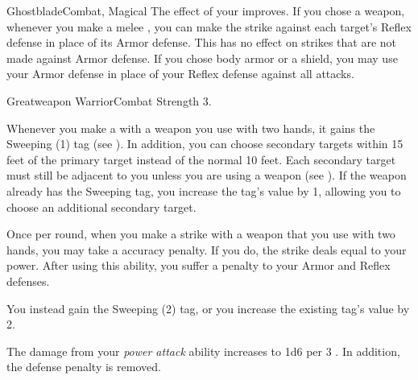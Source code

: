 \begin{magicalfeat}{Ghostblade}{Combat, Magical}
         The effect of your  improves.
        If you chose a weapon, whenever you make a melee , you can make the strike against each target's Reflex defense in place of its Armor defense.
        This has no effect on strikes that are not made against Armor defense.
        If you chose body armor or a shield, you may use your Armor defense in place of your Reflex defense against all attacks.
    \end{magicalfeat}

    \begin{feat}{Greatweapon Warrior}{Combat}
        \featpre Strength 3.

         Whenever you make a   with a weapon you use with two hands, it gains the Sweeping (1) tag (see ).
        In addition, you can choose secondary targets within 15 feet of the primary target instead of the normal 10 feet.
        Each secondary target must still be adjacent to you unless you are using a  weapon (see ).
        If the weapon already has the Sweeping tag, you increase the tag's value by 1, allowing you to choose an additional secondary target.

         Once per round, when you make a  strike with a weapon that you use with two hands, you may take a  accuracy penalty.
        If you do, the strike deals  equal to your power.
        After using this ability, you  suffer a  penalty to your Armor and Reflex defenses.

         You instead gain the Sweeping (2) tag, or you increase the existing tag's value by 2.

         The damage from your \textit{power attack} ability increases to 1d6 per 3 .
        In addition, the defense penalty is removed.
    \end{feat}

